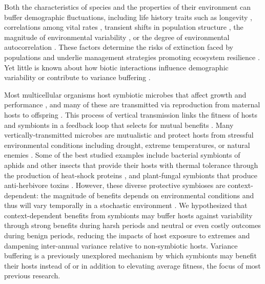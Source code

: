 \documentclass[9pt,twocolumn,twoside]{pnas-new}
\begin{document}
Both the characteristics of species and the properties of their environment can buffer demographic fluctuations, including life history traits such as longevity \cite{pfister1998patterns, morris2008longevity}, correlations among vital rates \cite{compagnoni2016effect}, transient shifts in population structure \cite{ellis2013role}, the magnitude of environmental variability \cite{rodriguez2021limits}, or the degree of environmental autocorrelation \cite{tuljapurkar1980population,fieberg2001stochastic}. 
These factors determine the risks of extinction faced by populations \cite{menges2000applications} and underlie management strategies promoting ecosystem resilience \cite{kuparinen2016fishing}. 
Yet little is known about how biotic interactions influence demographic variability or contribute to variance buffering \cite{hilde_demographic_2020}. 

Most multicellular organisms host symbiotic microbes that affect growth and performance \cite{rodriguez2009fungal,mcfall2013animals}, and many of these are transmitted via reproduction from maternal hosts to offspring \cite{funkhouser2013mom}.
This process of vertical transmission links the fitness of hosts and symbionts in a feedback loop that selects for mutual benefits \cite{fine1975vectors}.
Many vertically-transmitted microbes are mutualistic and protect hosts from stressful environmental conditions including drought, extreme temperatures, or natural enemies \cite{russell2006costs, kivlin2013fungal}. 
Some of the best studied examples include bacterial symbionts of aphids and other insects that provide their hosts with thermal tolerance through the production of heat-shock proteins \cite{dunbar2007aphid}, and plant-fungal symbionts that produce anti-herbivore toxins \cite{reyna2012detection,saikkonen2013chemical,neyaz2022localization}.
However, these diverse protective symbioses are context-dependent: the magnitude of benefits depends on environmental conditions \cite{chamberlain2014context} and thus will vary temporally in a stochastic environment \cite{jordano1994spatial}.
We hypothesized that context-dependent benefits from symbionts may buffer hosts against variability through strong benefits during harsh periods and neutral or even costly outcomes during benign periods, reducing the impacts of host exposure to extremes and dampening inter-annual variance relative to non-symbiotic hosts.
Variance buffering is a previously unexplored mechanism by which symbionts may benefit their hosts instead of or in addition to elevating average fitness, the focus of most previous research. 
\end{document}
